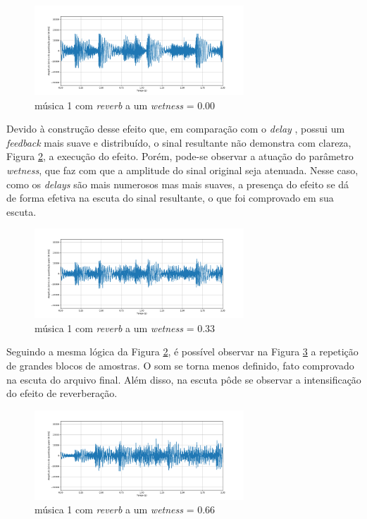 \begin{figure}[h]
    \centering
    \includegraphics[width=0.7\textwidth]{figuras/fig93.png}
    \caption{música 1 com \textit{reverb} a um \textit{wetness} = 0.00}
    \label{fig93}
\end{figure}

Devido à construção desse efeito que, em comparação com o \textit{delay}
, possui um \textit{feedback} mais suave e distribuído, o sinal resultante não demonstra com clareza, Figura \ref{fig94}, a execução do efeito. Porém, pode-se observar a atuação do parâmetro \textit{wetness}, que faz com que a amplitude do sinal original seja atenuada. Nesse caso, como os \textit{delays} são mais numerosos mas mais suaves, a presença do efeito se dá de forma efetiva na escuta do sinal resultante, o que foi comprovado em sua escuta.

\begin{figure}[h]
    \centering
    \includegraphics[width=0.7\textwidth]{figuras/fig94.png}
    \caption{música 1 com \textit{reverb} a um \textit{wetness} = 0.33}
    \label{fig94}
\end{figure}

Seguindo a mesma lógica da Figura \ref{fig94}, é possível observar na Figura \ref{fig95} a repetição de grandes blocos de amostras. O som se torna menos definido, fato comprovado na escuta do arquivo final. Além disso, na escuta pôde se observar a intensificação do efeito de reverberação.

\begin{figure}[h]
    \centering
    \includegraphics[width=0.7\textwidth]{figuras/fig95.png}
    \caption{música 1 com \textit{reverb} a um \textit{wetness} = 0.66}
    \label{fig95}
\end{figure}

